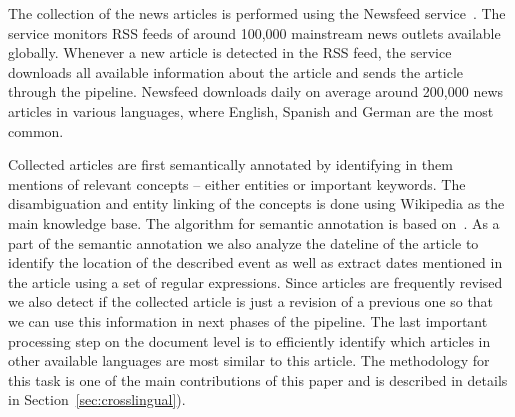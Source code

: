 \documentclass[twoside,11pt]{article}
\begin{document}
The collection of the news articles is performed using the Newsfeed service~\cite{Trampus2012}. The service monitors RSS feeds of around 100,000 mainstream news outlets available globally. Whenever a new article is detected in the RSS feed, the service downloads all available information about the article and sends the article through the pipeline. Newsfeed downloads daily on average around 200,000 news articles in various languages, where English, Spanish and German are the most common.

Collected articles are first semantically annotated by identifying in them mentions of relevant concepts -- either entities or important keywords. The disambiguation and entity linking of the concepts is done using Wikipedia as the main knowledge base. The algorithm for semantic annotation is based on~\cite{zhang2014saaacamactat}. As a part of the semantic annotation we also analyze the dateline of the article to identify the location of the described event as well as extract dates mentioned in the article using a set of regular expressions. Since articles are frequently revised we also detect if the collected article is just a revision of a previous one so that we can use this information in next phases of the pipeline. The last important processing step on the document level is to efficiently identify which articles in other available languages are most similar to this article. The methodology for this task is one of the main contributions of this paper and is described in details in Section~\ref{sec:crosslingual}).
\end{document}
